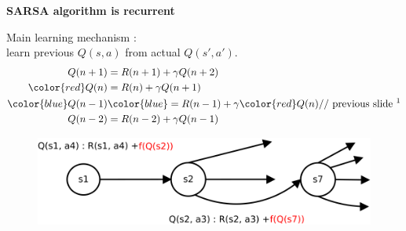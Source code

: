 \documentclass[xcolor=dvipsnames]{beamer}
\begin{document}
\begin{frame}{\bf SARSA algorithm is recurrent}

Main learning mechanism : \\
learn previous $Q(s, a)$ from actual $Q(s', a')$. \\

\begin{align*}
Q(n+1) &= R(n+1) + \gamma Q(n+2) \\
{\color{red} Q(n)} &= R(n) + \gamma Q(n+1) \\
{\color{blue} Q(n - 1)}&{\color{blue} = R(n-1) + \gamma }{\color{red} Q(n)} \text{// previous slide \footnotemark}\\
Q(n - 2) &= R(n-2) + \gamma Q(n-1)
\end{align*}

\begin{figure}[htbp]
  \centering
  \includegraphics[scale=0.28]{../diagrams/sarsa_learning_detail_2.png}
\end{figure}




\end{frame}
\end{document}
